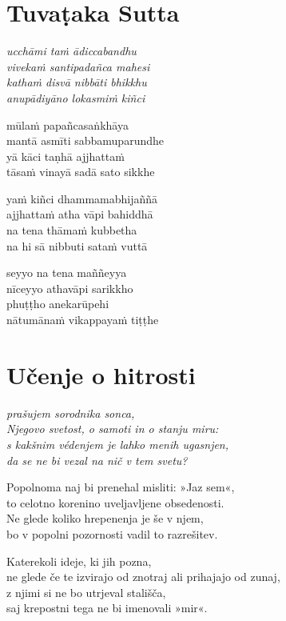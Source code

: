 

\cleartoverso
\chapter*{Tuvaṭaka Sutta}

\emph{ucchāmi taṁ ādiccabandhu\\
vivekaṁ santipadañca mahesi\\
kathaṁ disvā nibbāti bhikkhu\\
anupādiyāno lokasmiṁ kiñci}

mūlaṁ papañcasaṅkhāya\\
mantā asmīti sabbamuparundhe\\
yā kāci taṇhā ajjhattaṁ\\
tāsaṁ vinayā sadā sato sikkhe

yaṁ kiñci dhammamabhijaññā\\
ajjhattaṁ atha vāpi bahiddhā\\
na tena thāmaṁ kubbetha\\
na hi sā nibbuti sataṁ vuttā

seyyo na tena maññeyya\\
nīceyyo athavāpi sarikkho\\
phuṭṭho anekarūpehi\\
nātumānaṁ vikappayaṁ tiṭṭhe


\cleartorecto
\chapter{Učenje o hitrosti}

\emph{prašujem sorodnika sonca,\\
Njegovo svetost, o samoti in o stanju miru:\\
s kakšnim védenjem je lahko menih ugasnjen,\\
da se ne bi vezal na nič v tem svetu?}

Popolnoma naj bi prenehal misliti: »Jaz sem«,\\
to celotno korenino uveljavljene obsedenosti.\\
Ne glede koliko hrepenenja je še v njem,\\
bo v popolni pozornosti vadil to razrešitev.

Katerekoli ideje, ki jih pozna,\\
ne glede če te izvirajo od znotraj ali prihajajo od zunaj,\\
z njimi si ne bo utrjeval stališča,\\
saj krepostni tega ne bi imenovali »mir«.

